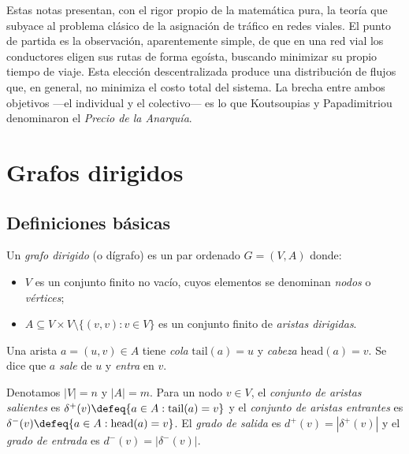 
Estas notas presentan, con el rigor propio de la matemática pura, la teoría que subyace al problema clásico de la asignación de tráfico en redes viales. El punto de partida es la observación, aparentemente simple, de que en una red vial los conductores eligen sus rutas de forma egoísta, buscando minimizar su propio tiempo de viaje. Esta elección descentralizada produce una distribución de flujos que, en general, no minimiza el costo total del sistema. La brecha entre ambos objetivos ---el individual y el colectivo--- es lo que Koutsoupias y Papadimitriou denominaron el \emph{Precio de la Anarquía}.

\section{Grafos dirigidos}

\subsection{Definiciones básicas}


\begin{definition}
Un \emph{grafo dirigido} (o dígrafo) es un par ordenado $G = (V, A)$ donde:
\begin{itemize}
    \item $V$ es un conjunto finito no vacío, cuyos elementos se denominan \emph{nodos} o \emph{vértices};
    \item $A \subseteq V \times V \setminus \{(v,v) : v \in V\}$ es un conjunto finito de \emph{aristas dirigidas}.
\end{itemize}
Una arista $a = (u, v) \in A$ tiene \emph{cola} $\mathrm{tail}(a) = u$ y \emph{cabeza} $\mathrm{head}(a) = v$. Se dice que $a$ \emph{sale} de $u$ y \emph{entra} en $v$.
\end{definition}

\begin{notation}
Denotamos $|V| = n$ y $|A| = m$. Para un nodo $v \in V$, el \emph{conjunto de aristas salientes} es $\delta^+(v) \defeq \{a \in A : \mathrm{tail}(a) = v\}$ y el \emph{conjunto de aristas entrantes} es $\delta^-(v) \defeq \{a \in A : \mathrm{head}(a) = v\}$. El \emph{grado de salida} es $d^+(v) = |\delta^+(v)|$ y el \emph{grado de entrada} es $d^-(v) = |\delta^-(v)|$.
\end{notation}

